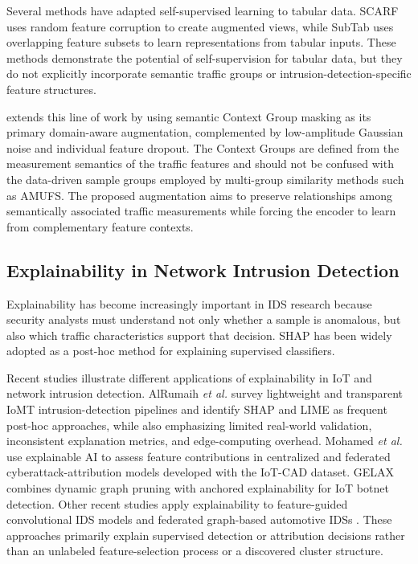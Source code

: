 Several methods have adapted self-supervised learning to tabular data. SCARF \cite{bahri2022scarf} uses random feature corruption to create augmented views, while SubTab \cite{ucar2021subtab} uses overlapping feature subsets to learn representations from tabular inputs. These methods demonstrate the potential of self-supervision for tabular data, but they do not explicitly incorporate semantic traffic groups or intrusion-detection-specific feature structures.

\method{} extends this line of work by using semantic Context Group masking as its primary domain-aware augmentation, complemented by low-amplitude Gaussian noise and individual feature dropout. The Context Groups are defined from the measurement semantics of the traffic features and should not be confused with the data-driven sample groups employed by multi-group similarity methods such as AMUFS. The proposed augmentation aims to preserve relationships among semantically associated traffic measurements while forcing the encoder to learn from complementary feature contexts.

\subsection{Explainability in Network Intrusion Detection}

Explainability has become increasingly important in IDS research because security analysts must understand not only whether a sample is anomalous, but also which traffic characteristics support that decision. SHAP \cite{lundberg2017unified} has been widely adopted as a post-hoc method for explaining supervised classifiers.

Recent studies illustrate different applications of explainability in IoT and network intrusion detection. AlRumaih \emph{et al.} \cite{alrumaih2026lightweight} survey lightweight and transparent IoMT intrusion-detection pipelines and identify SHAP and LIME as frequent post-hoc approaches, while also emphasizing limited real-world validation, inconsistent explanation metrics, and edge-computing overhead. Mohamed \emph{et al.} \cite{mohamed2025iot} use explainable AI to assess feature contributions in centralized and federated cyberattack-attribution models developed with the IoT-CAD dataset. GELAX \cite{esmaeilyfard2026gelax} combines dynamic graph pruning with anchored explainability for IoT botnet detection. Other recent studies apply explainability to feature-guided convolutional IDS models and federated graph-based automotive IDSs \cite{arya2025explainable,patokar2026secure}. These approaches primarily explain supervised detection or attribution decisions rather than an unlabeled feature-selection process or a discovered cluster structure.

